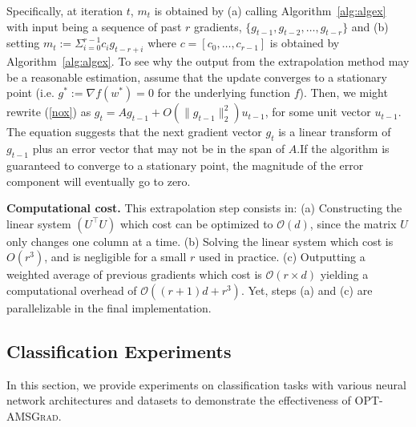 \documentclass[11pt]{article}
\theoremstyle{k}
\begin{document}
Specifically, at iteration $t$, $m_t$ is obtained by \textsf{(a)} calling Algorithm~\ref{alg:algex} with input being a sequence of past $r$ gradients, $\{ g_{t-1},g_{t-2}, \dots, g_{t-r} \}$ and \textsf{(b)} setting $m_t:= \Sigma_{i=0}^{r-1} c_i g_{t-r+i}$ where $c = [c_0, \dots, c_{r-1}] $ is obtained by Algorithm~\ref{alg:algex}.
To see why the output from the extrapolation method may be a reasonable estimation, assume that the update converges to a stationary point (i.e. $g^*:=\nabla f(w^*) = 0$ for the underlying function $f$). Then, we might rewrite (\ref{nox}) as $g_t = A g_{t-1}  + O( \| g_{t-1} \|_2^2 ) u_{t-1}$, for some unit vector $u_{t-1}$.
The equation suggests that the next gradient vector $g_{t}$ is a linear transform of $g_{{t-1}}$ plus an error vector that may not be in the span of $A$.If the algorithm is guaranteed to converge to a stationary point, the magnitude of the error component will eventually go to zero.

\textbf{Computational cost.} This extrapolation step consists in: \textsf{(a)} Constructing the linear system $(U^\top U)$ which cost can be optimized to $\mathcal O(d)$, since the matrix $U$ only changes one column at a time. \textsf{(b)} Solving the linear system which cost is $O(r^3)$, and is negligible for a small $r$ used in practice.\textsf{ (c)} Outputting a weighted average of previous gradients which cost is $\mathcal O(r \times d)$ yielding a computational overhead of $\mathcal O\left((r+1)d+r^3\right)$.
Yet, steps (a) and (c) are parallelizable in the final implementation.
\subsection{Classification Experiments}
In this section, we provide experiments on classification tasks with various neural network architectures and datasets to demonstrate the effectiveness of \textsc{OPT-AMSGrad}.
\end{document}
